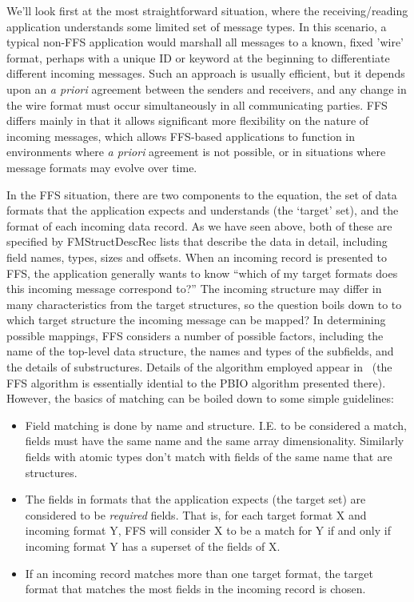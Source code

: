 We'll look first at the most straightforward situation, where the
receiving/reading application understands some limited set of message
types.  In this scenario, a typical non-FFS application would marshall all
messages to a known, fixed 'wire' format, perhaps with a unique ID or
keyword at the beginning to differentiate different incoming messages.  Such
an approach is usually efficient, but it depends upon an {\it a priori}
agreement between the senders and receivers, and any change in the wire
format must occur simultaneously in all communicating parties.  FFS differs
mainly in that it allows significant more flexibility on the nature of
incoming messages, which allows FFS-based applications to function in
environments where {\it a priori} agreement is not possible, or in
situations where message formats may evolve over time.

In the FFS situation, there are two components to the equation, the set of
data formats that the application expects and understands (the `target'
set), and the format of each incoming data record.  As we have seen above,
both of these are specified by FMStructDescRec lists that describe the data
in detail, including field names, types, sizes and offsets.  When an
incoming record is presented to FFS, the application generally wants to know
``which of my target formats does this incoming message correspond to?''
The incoming structure may differ in many characteristics from the target
structures, so the question boils down to to which target structure the
incoming message can be mapped?  In determining possible mappings, FFS
considers a number of possible factors, including the name of the top-level
data structure, the names and types of the subfields, and the details of
substructures.  Details of the algorithm employed appear
in~\cite{sandipmorph} (the FFS algorithm is essentially idential to the PBIO
algorithm presented there).  However, the basics of matching can be boiled
down to some simple guidelines:
\begin{itemize}
\item Field matching is done by name and structure.  I.E. to be considered a
  match, fields must have the same name and the same array dimensionality.
  Similarly fields with atomic types don't match with fields of the same
  name that are structures.
\item The fields in formats that the application expects (the target set) are
  considered to be {\em required} fields.  That is, for each target format
  X and incoming format Y, FFS will consider X to be a match for Y if and
  only if incoming format Y has a superset of the fields of X.
\item If an incoming record matches more than one target format, the target
  format that matches the most fields in the incoming record is chosen.
\end{itemize}

